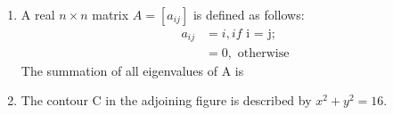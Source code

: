 \documentclass[journal,12pt,onecolumn]{IEEEtran}
\theoremstyle{remark}
\begin{document}
\begin{enumerate}
\item A real $n \times n$ matrix $A = [a_{ij}]$ is defined as follows: \newline 
\begin{align*}
    a_{ij} &=i, if \text{ i = j}; \\
    &= 0, \text{ otherwise}
\end{align*}
The summation of all eigenvalues of A is

\hfill{}
\begin{enumerate}
\end{enumerate}

\item The contour C in the adjoining figure is described by $x^2 + y^2 = 16$.\\ 
\begin{itemize}
\end{itemize}
\hfill{}
\begin{enumerate}
\end{enumerate}


\end{enumerate}
\end{document}
